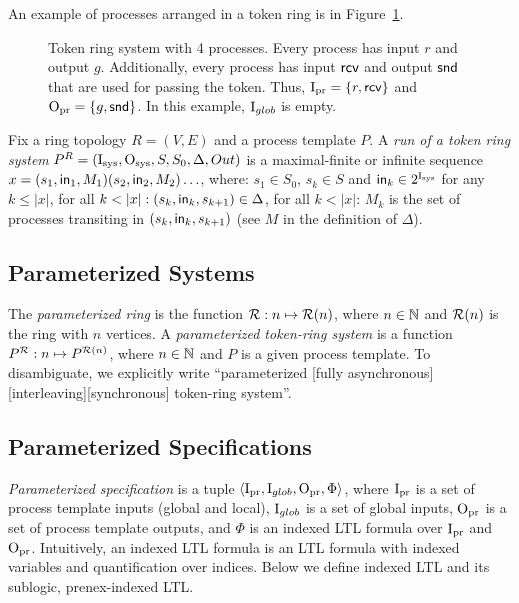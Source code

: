An example of processes arranged in a token ring is in Figure~\ref{fig:ring-architecture}.

\begin{figure}[tb]\center

\caption{Token ring system with 4 processes.
  Every process has input $r$ and output $g$.
  Additionally, every process has input $\mathsf{rcv}$ and output $\mathsf{snd}$ that are used for passing the token.
  Thus, ${\mathrm{I}_{\mathrm{pr}}}=\{r,\mathsf{rcv}\}$ and ${\mathrm{O}_{\mathrm{pr}}} = \{g,\mathsf{snd}\}$.
  In this example, $\mathrm{I}_{glob}$ is empty.}
\label{fig:ring-architecture}
\end{figure}


Fix a ring topology $R = (V,E)$ and a process template $P$.
A \emph{run of a token ring system}
$P^{R}=({\mathrm{I}_{\mathrm{sys}}},{\mathrm{O}_{\mathrm{sys}}},S,S_0,\Delta,Out)$ is a maximal-finite or infinite sequence
$x=(s_1,{\sf in}_1,M_1)(s_2,{\sf in}_2,M_2)\ldots$,
where:
\li
\- $s_1 \in S_0$, $s_k \in S$ and ${\sf in}_k \in 2^{\mathrm{I}_{\mathrm{sys}}}$ for any $k \le |x|$,
\- for all $k < |x|: (s_k,{\sf in}_k,s_{k+1}) \in \Delta$,
\- for all $k < |x|$: $M_k$ is the set of processes transiting in $(s_k,{\sf in}_k,s_{k+1})$
   (see $M$ in the definition of $\Delta$).
\il


\subsection{Parameterized Systems}

The \emph{parameterized ring} is the function $\mathcal {R}: n \mapsto \mathcal {R}(n)$,
where $n \in \mathbb{N}$ and $\mathcal {R}(n)$ is the ring with $n$ vertices.
A \emph{parameterized token-ring system} is a function $P^{\mathcal {R}}: n \mapsto P^{\mathcal {R}(n)}$,
where $n\in\mathbb{N}$ and $P$ is a given process template.
To disambiguate, we explicitly write
``parameterized [fully asynchronous][interleaving][synchronous] token-ring system''.



\subsection{Parameterized Specifications}\label{tok_rings:defs:indexed-ltl}

\emph{Parameterized specification} is a tuple $\left<{\mathrm{I}_{\mathrm{pr}}},\mathrm{I}_{glob},{\mathrm{O}_{\mathrm{pr}}},\Phi\right>$,
where ${\mathrm{I}_{\mathrm{pr}}}$ is a set of process template inputs (global and local),
$\mathrm{I}_{glob}$ is a set of global inputs,
${\mathrm{O}_{\mathrm{pr}}}$ is a set of process template outputs,
and $\Phi$ is an indexed LTL formula over ${\mathrm{I}_{\mathrm{pr}}}$ and ${\mathrm{O}_{\mathrm{pr}}}$.
Intuitively, an indexed LTL formula is an LTL formula with indexed variables and quantification over indices.
Below we define indexed LTL and its sublogic, prenex-indexed LTL.

